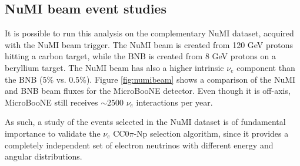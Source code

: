 
\subsection{NuMI beam event studies}
It is possible to run this analysis on the complementary NuMI dataset, acquired with the NuMI beam trigger. The NuMI beam is created from 120 GeV protons hitting a carbon target, while the BNB is created from 8 GeV protons on a beryllium target. The NuMI beam has also a higher intrinsic $\nu_{e}$ component than the BNB (5\% vs. 0.5\%). Figure \ref{fig:numibeam} shows a comparison of the NuMI and BNB beam fluxes for the MicroBooNE detector. Even though it is off-axis, MicroBooNE still receives $\sim2500$ $\nu_{e}$ interactions per year. 

As such, a study of the events selected in the NuMI dataset is of fundamental importance to validate the $\nu_{e}$ CC0$\pi$-Np selection algorithm, since it provides a completely independent set of electron neutrinos with different energy and angular distributions.

